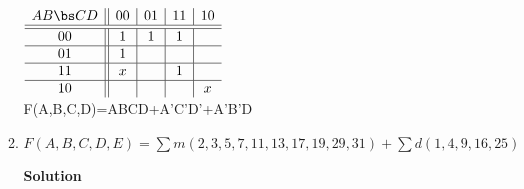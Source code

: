 \begin{enumerate}
\begin{enumerate}
\begin{onlysolution}
{                        $
                        \begin{array} {c||c|c|c|c}
                            A B \bs C D   & 00 & 01 & 11 & 10 \\ \hline \hline
                            00        & 1  & 1  & 1  &    \\ \hline
                            01        & 1  &    &    &    \\ \hline
                            11        & x  &    & 1  &    \\ \hline
                            10        &    &    &    & x  \\
                        \end{array}$ \\
                        F(A,B,C,D)=ABCD+A'C'D'+A'B'D
                    }
                \end{onlysolution}
            \item $F(A,B,C,D,E)=\sum m(2,3,5,7,11,13,17,19,29,31)+\sum d(1,4,9,16,25)$

                \begin{onlysolution}  \textbf{Solution} \itshape{

}
\end{onlysolution}
\end{enumerate}
\end{enumerate}

